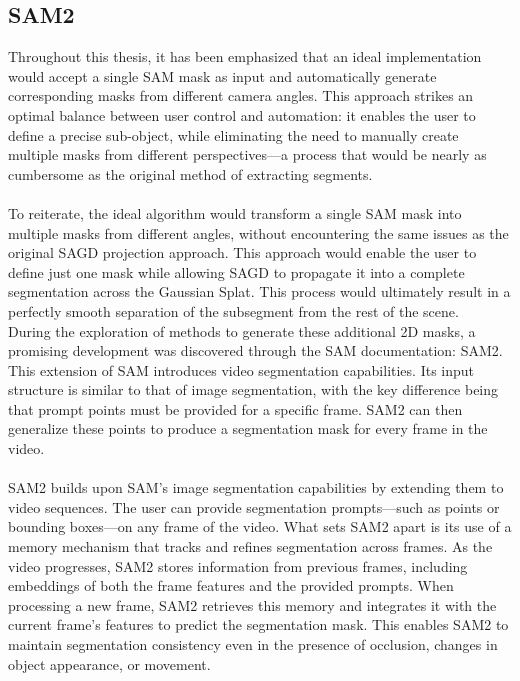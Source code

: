 \documentclass[12pt]{article}
\begin{document}
\subsection{SAM2}
Throughout this thesis, it has been emphasized that an ideal implementation would accept a single SAM mask as input and automatically generate corresponding masks from different camera angles. This approach strikes an optimal balance between user control and automation: it enables the user to define a precise sub-object, while eliminating the need to manually create multiple masks from different perspectives—a process that would be nearly as cumbersome as the original method of extracting segments.
\\\\
To reiterate, the ideal algorithm would transform a single SAM mask into multiple masks from different angles, without encountering the same issues as the original SAGD projection approach. This approach would enable the user to define just one mask while allowing SAGD to propagate it into a complete segmentation across the Gaussian Splat. This process would ultimately result in a perfectly smooth separation of the subsegment from the rest of the scene.\\
During the exploration of methods to generate these additional 2D masks, a promising development was discovered through the SAM documentation: SAM2. This extension of SAM introduces video segmentation capabilities. Its input structure is similar to that of image segmentation, with the key difference being that prompt points must be provided for a specific frame. SAM2 can then generalize these points to produce a segmentation mask for every frame in the video.
\\\\
SAM2 builds upon SAM’s image segmentation capabilities by extending them to video sequences. The user can provide segmentation prompts—such as points or bounding boxes—on any frame of the video. What sets SAM2 apart is its use of a memory mechanism that tracks and refines segmentation across frames. As the video progresses, SAM2 stores information from previous frames, including embeddings of both the frame features and the provided prompts. When processing a new frame, SAM2 retrieves this memory and integrates it with the current frame’s features to predict the segmentation mask. This enables SAM2 to maintain segmentation consistency even in the presence of occlusion, changes in object appearance, or movement.
\\\\
\end{document}
